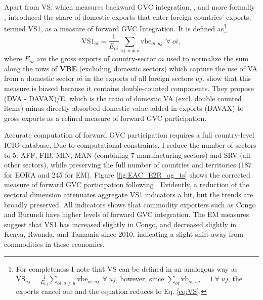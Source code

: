 \documentclass[a4paper]{article}
\begin{document}
Apart from VS, which measures backward GVC integration, \citet{hummels2001nature}, and more formally \citet{daudin2011produces}, introduced the share of domestic exports that enter foreign countries' exports, termed VS1, as a measure of forward GVC Integration. It is defined as\footnote{For completeness I note that VS can be defined in an analogous way as $\text{VS}_{uj} = \frac{1}{E_{uj}} \sum_{oi, o \neq  u} \text{vbe}_{oi, uj}\ \ \forall\ uj$, however, since $\sum_{oi} \text{vb}_{oi, uj} = 1\ \forall\ uj$, the exports cancel out and the equation reduces to Eq. \ref{eq:VS}. \vspace{-6mm}}
\begin{equation} \label{eq:VS1}
\text{VS1}_{oi} = \frac{1}{E_{oi}} \sum_{uj, u \neq  o} \text{vbe}_{oi, uj}\ \ \forall\ oi,
\end{equation}
\noindent where $E_{oi}$ are the gross exports of country-sector $oi$ used to normalize the sum along the rows of \textbf{VBE} (excluding domestic sectors) which capture the use of VA from a domestic sector $oi$ in the exports of all foreign sectors $uj$. \citet{borin2019measuring} show that this measure is biased because it contains double-counted components. They propose (DVA - DAVAX)/E, which is the ratio of domestic VA (excl. double counted items) minus directly absorbed domestic value added in exports (DAVAX) to gross exports as a refined measure of forward GVC participation. \newline 

Accurate computation of forward GVC participation requires a full country-level ICIO database. Due to computational constraints, I reduce the number of sectors to 5: AFF, FIB, MIN, MAN (combining 7 manufacturing sectors) and SRV (all other sectors), while preserving the full number of countries and territories (187 for EORA and 245 for EM). Figure \ref{fig:EAC_E2R_ag_ts} shows the corrected measure of forward GVC participation following \citet{borin2019measuring}. Evidently, a reduction of the sectoral dimension attenuates aggregate VS1 indicators a bit, but the trends are broadly preserved.  
All indicators shows that commodity exporters such as Congo and Burundi have higher levels of forward GVC integration. The EM measures suggest that VS1 has increased slightly in Congo, and decreased slightly in Kenya, Rwanda, and Tanzania since 2010, indicating a slight shift away from commodities in these economies. 
\end{document}
